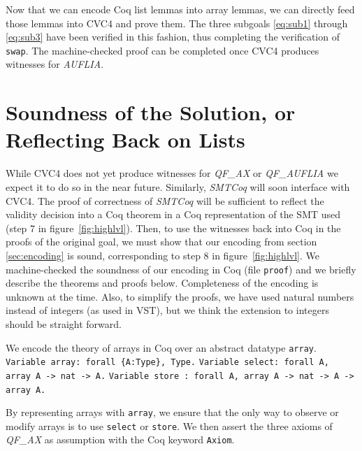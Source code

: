 \documentclass[onecolumn, preprint]{sigplanconf}
\begin{document}
%

Now that we can encode Coq list lemmas into array lemmas, we can directly feed those lemmas into CVC4 and prove them. The three subgoals \ref{eq:sub1} through \ref{eq:sub3} have been verified in this fashion, thus completing the verification of \texttt{swap}. The machine-checked proof can be completed once CVC4 produces witnesses for \emph{AUFLIA}.


\section{Soundness of the Solution, or Reflecting Back on Lists}
\label{sec:proofs}
While CVC4 does not yet produce witnesses for \emph{QF\_AX} or \emph{QF\_AUFLIA} we expect it to do so in the near future. Similarly, \emph{SMTCoq} will soon interface with CVC4. The proof of correctness of \emph{SMTCoq} will be sufficient to reflect the validity decision into a Coq theorem in a Coq representation of the SMT used (step 7 in figure~\ref{fig:highlvl}). Then, to use the witnesses back into Coq in the proofs of the original goal, we must show that our encoding from section \ref{sec:encoding} is sound, corresponding to step 8 in figure~\ref{fig:highlvl}. We machine-checked the soundness of our encoding in Coq (file \texttt{proof}) and we briefly describe the theorems and proofs below. Completeness of the encoding is unknown at the time. 
Also, to simplify the proofs, we have used natural numbers instead of integers (as used in VST), but we think the extension to integers should be straight forward.

We encode the theory of arrays in Coq over an abstract datatype \texttt{array}.  
 \newline
  \texttt{Variable array: forall \{A:Type\}, Type.} \newline
  \texttt{Variable select: forall {A}, array A -> nat -> A.} \newline
  \texttt{Variable store : forall {A}, array A -> nat -> A -> array A.}

By representing arrays with \texttt{array}, we ensure that the only way to observe or modify arrays is to use \texttt{select} or \texttt{store}. We then assert the three axioms of \emph{QF\_AX} as assumption with the Coq keyword \texttt{Axiom}.
\end{document}
